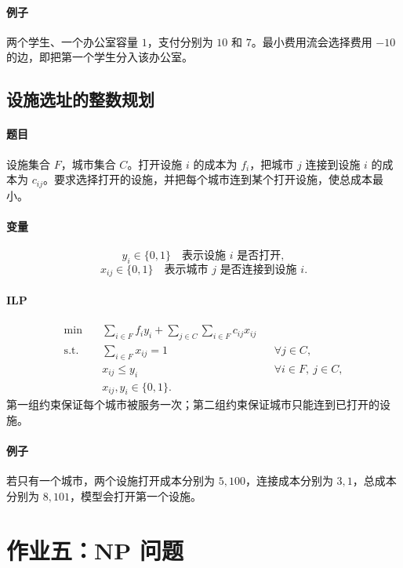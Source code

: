 \documentclass[UTF8,openany,12pt]{ctexbook}
\theoremstyle{remark}
\begin{document}
\paragraph{例子}
两个学生、一个办公室容量 $1$，支付分别为 $10$ 和 $7$。最小费用流会选择费用
$-10$ 的边，即把第一个学生分入该办公室。

\subsection{设施选址的整数规划}

\paragraph{题目}
设施集合 $F$，城市集合 $C$。打开设施 $i$ 的成本为 $f_i$，把城市 $j$ 连接到设施 $i$ 的成本为
$c_{ij}$。要求选择打开的设施，并把每个城市连到某个打开设施，使总成本最小。

\paragraph{变量}
\[
  y_i\in\{0,1\}\quad \text{表示设施 }i\text{ 是否打开},
\]
\[
  x_{ij}\in\{0,1\}\quad \text{表示城市 }j\text{ 是否连接到设施 }i.
\]

\paragraph{ILP}
\[
\begin{aligned}
  \min\quad &\sum_{i\in F} f_i y_i+\sum_{j\in C}\sum_{i\in F}c_{ij}x_{ij}\\
  \text{s.t.}\quad
  &\sum_{i\in F}x_{ij}=1 &&\forall j\in C,\\
  &x_{ij}\le y_i &&\forall i\in F,\ j\in C,\\
  &x_{ij},y_i\in\{0,1\}.
\end{aligned}
\]
第一组约束保证每个城市被服务一次；第二组约束保证城市只能连到已打开的设施。

\paragraph{例子}
若只有一个城市，两个设施打开成本分别为 $5,100$，连接成本分别为 $3,1$，总成本分别为
$8,101$，模型会打开第一个设施。

\section{作业五：NP 问题}
\end{document}
